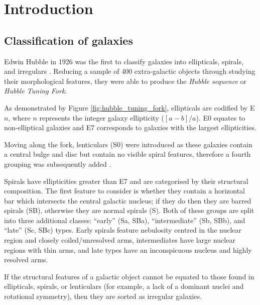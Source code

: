 \documentclass[12pt, twocolumn]{revtex4-1}    %
\begin{document}

\null\newpage
\null\newpage
\tableofcontents
\newpage

\section{Introduction} 
\subsection{Classification of galaxies}
\noindent
Edwin Hubble in 1926 was the first to classify galaxies into ellipticals, spirals, and irregulars \citep{1926ApJ....64..321H}. Reducing a sample of 400 extra-galactic objects through studying their morphological features, they were able to produce the \textit{Hubble sequence} or \textit{Hubble Tuning Fork}.

As demonstrated by Figure \ref{fig:hubble_tuning_fork}, ellipticals are codified by E$n$, where $n$ represents the integer galaxy ellipticity ($[a-b]/a$). E0 equates to non-elliptical galaxies and E7 corresponds to galaxies with the largest ellipticities. 

Moving along the fork, lenticulars (S0) were introduced as these galaxies contain a central bulge and disc but contain no visible spiral features, therefore a fourth grouping was subsequently added \citep{1961hag..book.....S, 1975gaun.book....1S, 1994cag..book.....S}. 

Spirals have ellipticities greater than E7 and are categorised by their structural composition. The first feature to consider is whether they contain a horizontal bar which intersects the central galactic nucleus; if they do then they are barred spirals (SB), otherwise they are normal spirals (S). Both of these groups are split into three additional classes: ``early'' (Sa, SBa), ``intermediate'' (Sb, SBb), and ``late'' (Sc, SBc) types. Early spirals feature nebulosity centred in the nuclear region and closely coiled/unresolved arms, intermediates have large nuclear regions with thin arms, and late types have an inconspicuous nucleus and highly resolved arms.  

If the structural features of a galactic object cannot be equated to those found in ellipticals, spirals, or lenticulars (for example, a lack of a dominant nuclei and rotational symmetry), then they are sorted as irregular galaxies.
\end{document}
